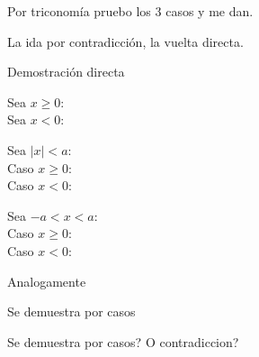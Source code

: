 \documentclass[10pt]{article}
\begin{document}
\begin{prf}[$|x| \geq 0, |x| = 0 \Leftrightarrow x = 0$]{}
	Por triconomía pruebo los 3 casos y me dan.

	La ida por contradicción, la vuelta directa.
\end{prf}

\begin{prf}[$|x| = |-x|$]{}
	Demostración directa
\end{prf}

\begin{prf}{}
	Sea $x \geq 0$:\\
	Sea $x < 0$:\\
\end{prf}

\begin{prf}[$|x| < a \Leftrightarrow -a < x < a$]{}
	Sea $|x| < a$:\\
	Caso $x \geq 0$:\\
	Caso $x < 0$:\\

	Sea $-a < x < a$:\\
	Caso $x \geq 0$:\\
	Caso $x < 0$:\\
\end{prf}

\begin{prf}{}
	Analogamente
\end{prf}

\begin{prf}{}
	Se demuestra por casos
\end{prf}

\begin{prf}{}
	Se demuestra por casos? O contradiccion?
\end{prf}

\begin{prf}{}
	
\end{prf}
\end{document}
